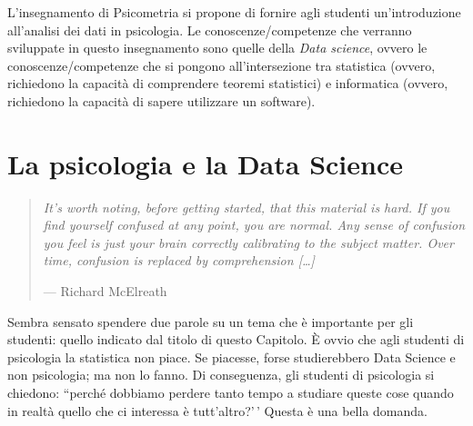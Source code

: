 \documentclass[
  10pt,
  italian,
  a4paper,
  extrafontsizes,onecolumn,openright
  ]{memoir}
\theoremstyle{definition}
\theoremstyle{definition}
\theoremstyle{definition}
\theoremstyle{definition}
\theoremstyle{remark}
\begin{document}
L'insegnamento di Psicometria si propone di fornire agli studenti un'introduzione all'analisi dei dati in psicologia.
Le conoscenze/competenze che verranno sviluppate in questo insegnamento sono quelle della \emph{Data science}, ovvero le conoscenze/competenze che si pongono all'intersezione tra statistica (ovvero, richiedono la capacità di comprendere teoremi statistici) e informatica (ovvero, richiedono la capacità di sapere utilizzare un software).

\hypertarget{la-psicologia-e-la-data-science}{%
\section*{La psicologia e la Data Science}\label{la-psicologia-e-la-data-science}}

\begin{quote}
\emph{It's worth noting, before getting started, that this material is hard. If you find yourself confused at any point, you are normal. Any sense of confusion you feel is just your brain correctly calibrating to the subject matter. Over time, confusion is replaced by comprehension {[}\ldots{]}}

\hfill --- Richard McElreath
\end{quote}

Sembra sensato spendere due parole su un tema che è importante per gli studenti: quello indicato dal titolo di questo Capitolo. È ovvio che agli studenti di psicologia la statistica non piace. Se piacesse, forse studierebbero Data Science e non psicologia; ma non lo fanno. Di conseguenza, gli studenti di psicologia si chiedono: ``perché dobbiamo perdere tanto tempo a studiare queste cose quando in realtà quello che ci interessa è tutt'altro?'\,' Questa è una bella domanda.
\end{document}
